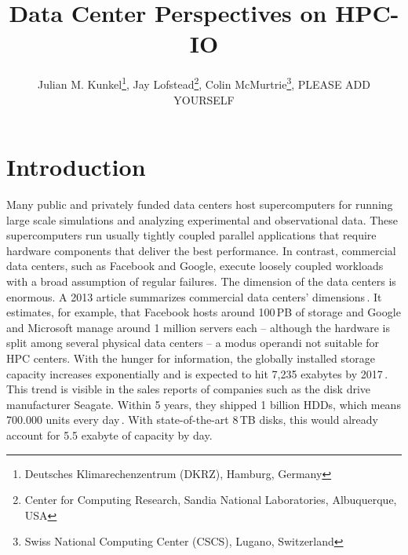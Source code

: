 \documentclass{superfri}
\numberwithin{equation}{section}
\begin{document}

\author{Julian M. Kunkel\footnote{\label{dkrz}Deutsches Klimarechenzentrum (DKRZ), Hamburg, Germany}, 
Jay Lofstead\footnote{Center for Computing Research, Sandia National Laboratories, Albuquerque, USA}, 
Colin McMurtrie\footnote{Swiss National Computing Center (CSCS), Lugano, Switzerland}, 
PLEASE ADD YOURSELF
} %

\title{Data Center Perspectives on HPC-IO}
\maketitle{}

\begin{abstract}

\noindent
{}
\end{abstract}

\section{Introduction}
\label{sec:intro}

Many public and privately funded data centers host supercomputers for running large scale simulations and analyzing experimental and observational data.
These supercomputers run usually tightly coupled parallel applications that require hardware components that deliver the best performance.
In contrast, commercial data centers, such as Facebook and Google, execute loosely coupled workloads with a broad assumption of regular failures.
The dimension of the data centers is enormous.
A 2013 article summarizes commercial data centers' dimensions\,\cite{data13}. It estimates, for example, that 
Facebook hosts around 100\,PB of storage and Google and Microsoft manage around 1 million servers each -- although the hardware is split among several physical data centers -- a modus operandi not suitable for HPC centers.
With the hunger for information, the globally installed storage capacity increases exponentially and is expected to hit 7,235 exabytes by 2017\,\cite{EXA13}.
This trend is visible in the sales reports of companies such as the disk drive manufacturer Seagate. Within 5 years, they shipped 1 billion HDDs, which means 700.000 units every day\,\cite{SG14}.  
With state-of-the-art 8\,TB disks, this would already account for 5.5 exabyte of capacity by day.
\end{document}
